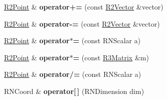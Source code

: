 \begin{DoxyCompactItemize}
\item 
\hyperlink{class_r2_point}{R2\+Point} \& {\bfseries operator+=} (const \hyperlink{class_r2_vector}{R2\+Vector} \&vector)\hypertarget{class_r2_point_a87132970f92b834cb125ed4107efbf30}{}\label{class_r2_point_a87132970f92b834cb125ed4107efbf30}

\item 
\hyperlink{class_r2_point}{R2\+Point} \& {\bfseries operator-\/=} (const \hyperlink{class_r2_vector}{R2\+Vector} \&vector)\hypertarget{class_r2_point_a7f81f09284a7c702c6284588f1621a66}{}\label{class_r2_point_a7f81f09284a7c702c6284588f1621a66}

\item 
\hyperlink{class_r2_point}{R2\+Point} \& {\bfseries operator$\ast$=} (const R\+N\+Scalar a)\hypertarget{class_r2_point_a88333f7022698d87711bc006fc5bd857}{}\label{class_r2_point_a88333f7022698d87711bc006fc5bd857}

\item 
\hyperlink{class_r2_point}{R2\+Point} \& {\bfseries operator$\ast$=} (const \hyperlink{class_r3_matrix}{R3\+Matrix} \&m)\hypertarget{class_r2_point_a7a97ee5c7fac06fbf06aff524f491e67}{}\label{class_r2_point_a7a97ee5c7fac06fbf06aff524f491e67}

\item 
\hyperlink{class_r2_point}{R2\+Point} \& {\bfseries operator/=} (const R\+N\+Scalar a)\hypertarget{class_r2_point_ae873b665426dbb14da5052fc33f6d995}{}\label{class_r2_point_ae873b665426dbb14da5052fc33f6d995}

\item 
R\+N\+Coord \& {\bfseries operator\mbox{[}$\,$\mbox{]}} (R\+N\+Dimension dim)\hypertarget{class_r2_point_ac730f46bee8a8a021ed210ad59d9f1dd}{}\label{class_r2_point_ac730f46bee8a8a021ed210ad59d9f1dd}

\end{DoxyCompactItemize}
